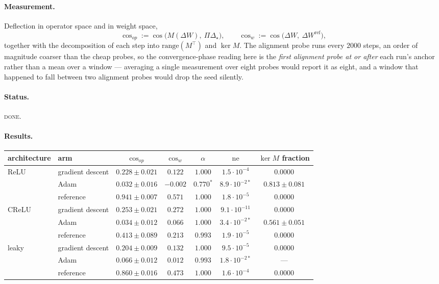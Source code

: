 \documentclass{article} %
\theoremstyle{plain}
\theoremstyle{definition}
\theoremstyle{remark}
\begin{document}
\paragraph{Measurement.}
Deflection in operator space and in weight space,
\begin{equation}
  \cos_{op} := \cos\big(M(\Delta W),\ \Pi\Delta_\star\big), \qquad
  \cos_{w}  := \cos\big(\Delta W,\ \Delta W^{\mathrm{ref}}\big),
  \label{eq:cosops}
\end{equation}
together with the decomposition of each step into $\mathrm{range}(M^\top)$ and $\ker M$. The
alignment probe runs every $2000$ steps, an order of magnitude coarser than the cheap probes, so
the convergence-phase reading here is the \emph{first alignment probe at or after} each run's
anchor rather than a mean over a window --- averaging a single measurement over eight probes would
report it as eight, and a window that happened to fall between two alignment probes would drop the
seed silently.

\paragraph{Status.} \textsc{done}.

\paragraph{Results.}

\begin{center}\small
\begin{tabular}{llccccc}
\toprule
architecture & arm & $\cos_{op}$ & $\cos_{w}$ & $\alpha$ & $\mathrm{ne}$ & $\ker M$ fraction \\
\midrule
ReLU   & gradient descent & $0.228 \pm 0.021$ & $0.122$  & $1.000$ & $1.5\cdot10^{-4}$ & $0.0000$ \\
       & Adam             & $0.032 \pm 0.016$ & $-0.002$ & $0.770^\ast$ & $8.9\cdot10^{-2\ast}$ & $\mathbf{0.813 \pm 0.081}$ \\
       & reference        & $0.941 \pm 0.007$ & $0.571$  & $1.000$ & $1.8\cdot10^{-5}$ & $0.0000$ \\
\midrule
CReLU  & gradient descent & $0.253 \pm 0.021$ & $0.272$  & $1.000$ & $9.1\cdot10^{-11}$ & $0.0000$ \\
       & Adam             & $0.034 \pm 0.012$ & $0.066$  & $1.000$ & $3.4\cdot10^{-2\ast}$ & $\mathbf{0.561 \pm 0.051}$ \\
       & reference        & $0.413 \pm 0.089$ & $0.213$  & $0.993$ & $1.9\cdot10^{-5}$ & $0.0000$ \\
\midrule
leaky  & gradient descent & $0.204 \pm 0.009$ & $0.132$  & $1.000$ & $9.5\cdot10^{-5}$ & $0.0000$ \\
       & Adam             & $0.066 \pm 0.012$ & $0.012$  & $0.993$ & $1.8\cdot10^{-2\ast}$ & --- \\
       & reference        & $0.860 \pm 0.016$ & $0.473$  & $1.000$ & $1.6\cdot10^{-4}$ & $0.0000$ \\
\bottomrule
\end{tabular}
\end{center}
\end{document}
